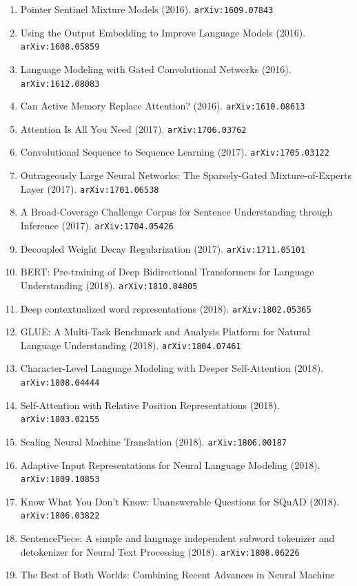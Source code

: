 \documentclass[11pt]{article}
\begin{document}
\begin{enumerate}
  \item Pointer Sentinel Mixture Models (2016). \texttt{arXiv:1609.07843}
  \item Using the Output Embedding to Improve Language Models (2016). \texttt{arXiv:1608.05859}
  \item Language Modeling with Gated Convolutional Networks (2016). \texttt{arXiv:1612.08083}
  \item Can Active Memory Replace Attention? (2016). \texttt{arXiv:1610.08613}
  \item Attention Is All You Need (2017). \texttt{arXiv:1706.03762}
  \item Convolutional Sequence to Sequence Learning (2017). \texttt{arXiv:1705.03122}
  \item Outrageously Large Neural Networks: The Sparsely-Gated
  Mixture-of-Experts Layer (2017). \texttt{arXiv:1701.06538}
  \item A Broad-Coverage Challenge Corpus for Sentence Understanding through
  Inference (2017). \texttt{arXiv:1704.05426}
  \item Decoupled Weight Decay Regularization (2017). \texttt{arXiv:1711.05101}
  \item BERT: Pre-training of Deep Bidirectional Transformers for Language
  Understanding (2018). \texttt{arXiv:1810.04805}
  \item Deep contextualized word representations (2018). \texttt{arXiv:1802.05365}
  \item GLUE: A Multi-Task Benchmark and Analysis Platform for Natural Language
  Understanding (2018). \texttt{arXiv:1804.07461}
  \item Character-Level Language Modeling with Deeper Self-Attention (2018). \texttt{arXiv:1808.04444}
  \item Self-Attention with Relative Position Representations (2018). \texttt{arXiv:1803.02155}
  \item Scaling Neural Machine Translation (2018). \texttt{arXiv:1806.00187}
  \item Adaptive Input Representations for Neural Language Modeling (2018). \texttt{arXiv:1809.10853}
  \item Know What You Don't Know: Unanswerable Questions for SQuAD (2018). \texttt{arXiv:1806.03822}
  \item SentencePiece: A simple and language independent subword tokenizer and
  detokenizer for Neural Text Processing (2018). \texttt{arXiv:1808.06226}
  \item The Best of Both Worlds: Combining Recent Advances in Neural Machine

\end{enumerate}
\end{document}
